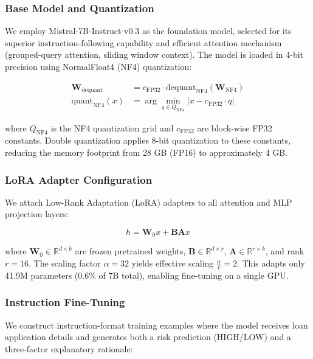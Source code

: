 \documentclass[11pt,a4paper]{article}
\begin{document}
\subsubsection{Base Model and Quantization}

We employ Mistral-7B-Instruct-v0.3 as the foundation model, selected for its superior instruction-following capability and efficient attention mechanism (grouped-query attention, sliding window context). The model is loaded in 4-bit precision using NormalFloat4 (NF4) quantization:

\begin{align}
\mathbf{W}_{\text{dequant}} &= c_{\text{FP32}} \cdot \text{dequant}_{\text{NF4}}(\mathbf{W}_{\text{NF4}}) \\
\text{quant}_{\text{NF4}}(x) &= \arg\min_{q \in Q_{\text{NF4}}} |x - c_{\text{FP32}} \cdot q|
\end{align}

where $Q_{\text{NF4}}$ is the NF4 quantization grid and $c_{\text{FP32}}$ are block-wise FP32 constants. Double quantization applies 8-bit quantization to these constants, reducing the memory footprint from 28 GB (FP16) to approximately 4 GB.

\subsubsection{LoRA Adapter Configuration}

We attach Low-Rank Adaptation (LoRA) adapters to all attention and MLP projection layers:

\begin{equation}
h = \mathbf{W}_0 x + \mathbf{B}\mathbf{A}x
\end{equation}

where $\mathbf{W}_0 \in \mathbb{R}^{d \times k}$ are frozen pretrained weights, $\mathbf{B} \in \mathbb{R}^{d \times r}$, $\mathbf{A} \in \mathbb{R}^{r \times k}$, and rank $r = 16$. The scaling factor $\alpha = 32$ yields effective scaling $\frac{\alpha}{r} = 2$. This adapts only 41.9M parameters (0.6\% of 7B total), enabling fine-tuning on a single GPU.

\subsubsection{Instruction Fine-Tuning}

We construct instruction-format training examples where the model receives loan application details and generates both a risk prediction (HIGH/LOW) and a three-factor explanatory rationale:
\end{document}
